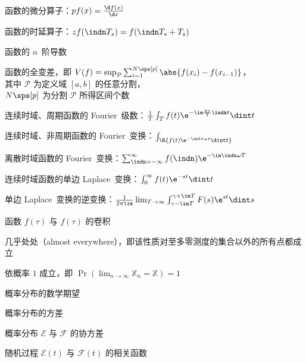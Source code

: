 \item[{{$p$}}] 函数的微分算子：$p f(x) = \frac{\d f(x)}{\d x}$
\item[{{$z$}}] 函数的时延算子：$z f(\indn T_s) = f(\indn T_s + T_s)$
\item[{{$f\sps[(n)](x)$}}] 函数的 $n$~阶导数
\item[{{$V(f)$}}] 函数的全变差，即 $V(f) = \sup_{\mathcal{P}}{\sum_{i=1}^{N\sps[p]}{\abs{f(x_i) - f(x_{i-1})}}}$，
    \\ 其中 $\mathcal{P}$ 为定义域 $[a, b]$ 的任意分割，
    \\ $N\sps[p]$ 为分割 $\mathcal{P}$ 所得区间个数
\item[{{$\Fc_{f}(\indk)$}}] 连续时域、周期函数的 Fourier~级数：$\frac{1}{T}\int_T{f(t)\e^{-\im\frac{2\pi}{T}\indk t}\dint t}$
\item[{{$\Fc_{f}(\omega)$}}] 连续时域、非周期函数的 Fourier~变换：$\int_\R{f(t)\e^{-\im2\pi\omega t}\dint t}$
\item[{{$\Fd_{f}(\e^{\im\omega T})$}}] 离散时域函数的 Fourier~变换：$\sum_{\indn=-\infty}^{\infty}{f(\indn)\e^{-\im\indn\omega T}}$
\item[{{$\Lu_{f}(s)$}}] 连续时域函数的单边 Laplace~变换：$\int_0^\infty{f(t)\e^{-st}\dint t}$
\item[{{$\Lu_{F}^{-1}(t)$}}] 单边 Laplace~变换的逆变换：$\frac{1}{2\pi\im}\lim_{T\to\infty}{\int_{\gamma-\im T}^{\gamma+\im T}{F(s)\e^{st}\dint s}}$ %
\item[{{$(f \circledast g)(t)$}}] 函数 $f(\tau)$ 与 $f(\tau)$ 的卷积
\item[{{a.e.}}] 几乎处处（almost everywhere），即该性质对至多零测度的集合以外的所有点都成立
\item[{{w.p.1}}] 依概率 $1$ 成立，即 $\Pr( \lim_{n\to\infty}{\mathbb{X}_n} = \mathbb{X} ) = 1$
\item[{{$\E\mathcal{D}$}}] 概率分布的数学期望
\item[{{$\Var\mathcal{D}$}}] 概率分布的方差
\item[{{$\Cov(\mathcal{E},\mathcal{F})$}}] 概率分布 $\mathcal{E}$ 与 $\mathcal{F}$ 的协方差
\item[{{$\Corr_{\mathcal{E}, \mathcal{F}}(\tau)$}}] 随机过程 $\mathcal{E}(t)$ 与 $\mathcal{F}(t)$ 的相关函数

\item %

